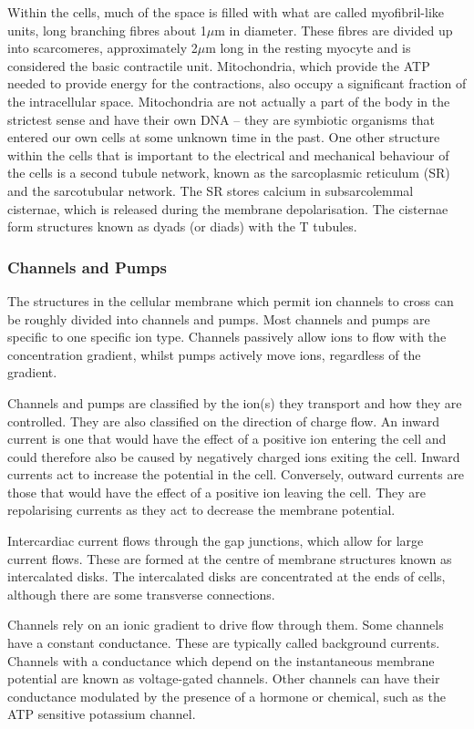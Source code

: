 Within the cells, much of the space is filled with what are called
myofibril-like units, long branching fibres about 1$\mu$m in diameter.
These fibres are divided up into scarcomeres, approximately 2$\mu$m long in the
resting myocyte and is considered the basic contractile unit.
Mitochondria, which provide the ATP needed to provide energy for the
contractions, also occupy a significant fraction of the intracellular space.
Mitochondria are not actually a part of the body in the strictest sense and
have their own DNA -- they are symbiotic organisms that entered our own cells
at some unknown time in the past.
One other structure within the cells that is important to the electrical and
mechanical behaviour of the cells is a second tubule network, known as the
sarcoplasmic reticulum (SR) and the sarcotubular network.
The SR stores calcium in subsarcolemmal cisternae, which is released during the
membrane depolarisation.
The cisternae form structures known as dyads (or diads) with the T tubules.

\subsubsection{Channels and Pumps}

The structures in the cellular membrane which permit ion channels to cross can
be roughly divided into channels and pumps.
Most channels and pumps are specific to one specific ion type.
Channels passively allow ions to flow with the concentration gradient, whilst
pumps actively move ions, regardless of the gradient.

Channels and pumps are classified by the ion(s) they transport and how they are
controlled.
They are also classified on the direction of charge flow.
An inward current is one that would have the effect of a positive ion entering
the cell and could therefore also be caused by negatively charged ions exiting
the cell.
Inward currents act to increase the potential in the cell.
Conversely, outward currents are those that would have the effect of a positive
ion leaving the cell.
They are repolarising currents as they act to decrease the membrane potential.

Intercardiac current flows through the gap junctions, which allow for large
current flows.
These are formed at the centre of membrane structures known as intercalated
disks.
The intercalated disks are concentrated at the ends of cells, although there are
some transverse connections.

Channels rely on an ionic gradient to drive flow through them.
Some channels have a constant conductance.
These are typically called background currents.
Channels with a conductance which depend on the instantaneous membrane potential
are known as voltage-gated channels.
Other channels can have their conductance modulated by the presence of a
hormone or chemical, such as the ATP sensitive potassium channel.

